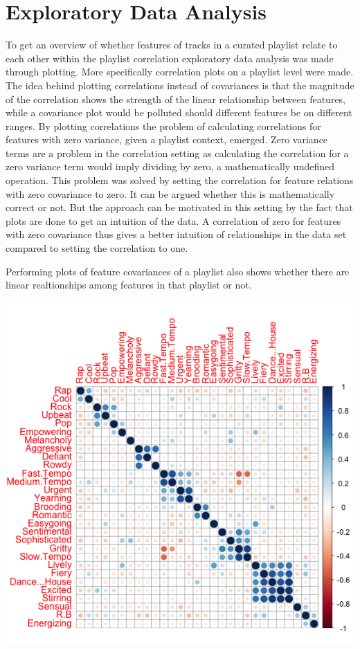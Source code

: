 \documentclass[a4paper,11pt]{kth-mag}
\begin{document}
\section{Exploratory Data Analysis}
To get an overview of whether features of tracks in a curated playlist relate to each other within the playlist correlation exploratory data analysis was made through plotting. More specifically correlation plots on a playlist level were made. The idea behind plotting correlations instead of covariances is that the magnitude of the correlation shows the strength of the linear relationship between features, while a covariance plot would be polluted should different features be on different ranges. By plotting correlations the problem of calculating correlations for features with zero variance, given a playlist context, emerged. Zero variance terms are a problem in the correlation setting as calculating the correlation for a zero variance term would imply dividing by zero, a mathematically undefined operation. This problem was solved by setting the correlation for feature relations with zero covariance to zero. It can be argued whether this is mathematically correct or not. But the approach can be motivated in this setting by the fact that plots are done to get an intuition of the data. A correlation of zero for features with zero covariance thus gives a better intuition of relationships in the data set compared to setting the correlation to one.

Performing plots of feature covariances of a playlist also shows whether there are linear realtionships among features in that playlist or not.

\includegraphics[scale=0.6]{images/0removedPlistFeaturePlot.png}
\end{document}
